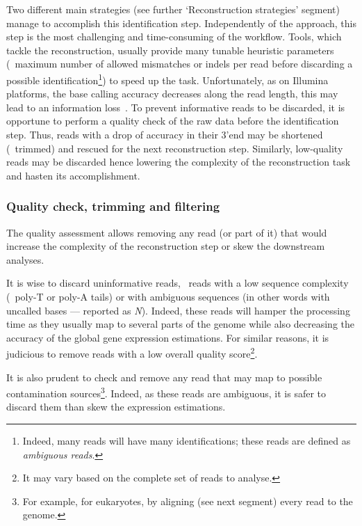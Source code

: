 Two different main strategies (see further `Reconstruction strategies' segment)
manage to accomplish this identification step. Independently of the
approach, this step is the most challenging and time-consuming
of the workflow. Tools, which tackle the reconstruction, usually provide
many tunable heuristic parameters (\eg\ maximum number of allowed mismatches
or indels per read before discarding a possible identification\footnote{Indeed,
many reads will have many identifications; these reads are defined as
\emph{ambiguous reads}.})
to speed up the task.
Unfortunately, as on Illumina platforms, the base calling accuracy decreases
along the read length, this may lead to an information loss~.
To prevent informative reads to be discarded, it is opportune to perform a quality
check of the raw data before the identification step. Thus, reads with a drop of
accuracy in their 3'end may be shortened (\ie\ trimmed) and rescued for the next
reconstruction step. Similarly, low-quality reads may be discarded hence
lowering the complexity
of the reconstruction task and hasten its accomplishment.\mybr\

\subsubsection{Quality check, trimming and filtering}\label{subsub:trim}

The quality assessment allows removing any read (or part of it) that would
increase the complexity of the reconstruction step or skew the downstream analyses.\mybr\

It is wise to discard uninformative reads, \ie\ reads with a low sequence
complexity (\eg\ poly-T or poly-A tails) or with ambiguous sequences (in other
words with uncalled bases --- reported as \emph{N}).
Indeed, these reads will hamper the processing time as they
usually map to several parts of the genome while also decreasing the accuracy of
the global gene expression estimations.
For similar reasons, it is judicious to remove reads with a low overall quality
score\footnote{It may vary based on the complete set of reads to analyse.}.\mybr\

It is also prudent to check and remove any read that may map to possible
contamination sources\footnote{For example, for eukaryotes, by aligning (see next
segment) every read to the  genome.}.
Indeed, as these reads are ambiguous, it is safer
to discard them than skew the expression estimations.\mybr\

